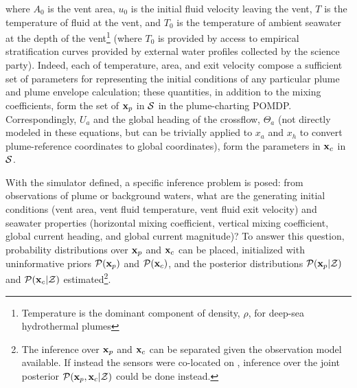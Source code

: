 \noindent where $A_0$ is the vent area, $u_0$ is the initial fluid velocity leaving the vent, $T$ is the temperature of fluid at the vent, and $T_0$ is the temperature of ambient seawater at the depth of the vent\footnote{Temperature is the dominant component of density, $\rho$, for deep-sea hydrothermal plumes} (where $T_0$ is provided by access to empirical stratification curves provided by external water profiles collected by the science party). Indeed, each of temperature, area, and exit velocity compose a sufficient set of parameters for representing the initial conditions of any particular plume and plume envelope calculation; these quantities, in addition to the mixing coefficients, form the set of $\mathbf{x}_p$ in $\mathcal{S}$ in the plume-charting POMDP. Correspondingly, $U_a$ and the global heading of the crossflow, $\Theta_a$ (not directly modeled in these equations, but can be trivially applied to $x_a$ and $x_h$ to convert plume-reference coordinates to global coordinates), form the parameters in $\mathbf{x}_c$ in $\mathcal{S}$.

With the simulator defined, a specific inference problem is posed: from observations of plume or background waters, what are the generating initial conditions (vent area, vent fluid temperature, vent fluid exit velocity) and seawater properties (horizontal mixing coefficient, vertical mixing coefficient, global current heading, and global current magnitude)? To answer this question, probability distributions over $\mathbf{x}_p$ and $\mathbf{x}_c$ can be placed, initialized with uninformative priors $\mathcal{P}(\mathbf{x}_p)$ and $\mathcal{P}(\mathbf{x}_c)$, and the posterior distributions $\mathcal{P}(\mathbf{x}_p | \mathcal{Z})$ and $\mathcal{P}(\mathbf{x}_c | \mathcal{Z})$ estimated\footnote{The inference over $\mathbf{x}_p$ and $\mathbf{x}_c$ can be separated given the observation model available. If instead the sensors were co-located on \Sentry, inference over the joint posterior $\mathcal{P}(\mathbf{x}_p, \mathbf{x}_c | \mathcal{Z})$ could be done instead.}.

